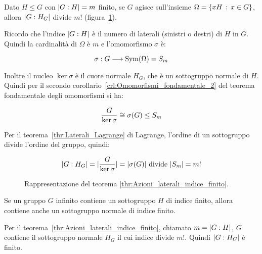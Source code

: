 \begin{teorema}
	\label{thr:Azioni_laterali_indice_finito}
	Dato $H \le G$ con $\lvert G:H \rvert= m$ finito, se $G$ agisce sull'insieme $\Omega = \{xH \,:\, x \in G\}$, allora $\lvert G:H_G \rvert$ divide $m!$ (figura~\ref{fig:Azioni_laterali_indice_finito}).
\end{teorema}
\begin{dimostrazione}
	Ricordo che l'indice $\lvert G:H \rvert$ è il numero di laterali (sinistri o destri) di $H$ in $G$. Quindi la cardinalità di $\Omega$ è $m$ e l'omomorfismo $\sigma$ è:
	
	\begin{equation}
		\sigma: G \longrightarrow \operatorname{Sym}(\Omega) = S_m
	\end{equation}

	Inoltre il nucleo $\ker \sigma$ è il cuore normale $H_G$, che è un sottogruppo normale di $H$. Quindi per il secondo corollario~\ref{crl:Omomorfismi_fondamentale_2} del teorema fondamentale degli omomorfismi si ha:
	
	\begin{equation}
		\dfrac{G}{\ker \sigma} \cong \sigma(G) \le S_m
	\end{equation}

	Per il teorema~\ref{thr:Laterali_Lagrange} di Lagrange, l'ordine di un sottogruppo divide l'ordine del gruppo, quindi:
	
	\begin{equation}
		\lvert G:H_G \rvert = \lvert \dfrac{G}{\ker \sigma} \rvert = \lvert \sigma(G) \rvert \text{ divide } \lvert S_m \rvert = m!
	\end{equation}
	
	
\end{dimostrazione}

\begin{figure}[tp]
	\centering
	\caption{Rappresentazione del teorema \ref{thr:Azioni_laterali_indice_finito}.}
	\label{fig:Azioni_laterali_indice_finito}
\end{figure}

\begin{teorema}
	Se un gruppo $G$ infinito contiene un sottogruppo $H$ di indice finito, allora contiene anche un sottogruppo normale di indice finito.
\end{teorema}
\begin{dimostrazione}
	Per il teorema~\ref{thr:Azioni_laterali_indice_finito}, chiamato $m = \lvert G:H \rvert$, $G$ contiene il sottogruppo normale $H_G$ il cui indice divide $m!$. Quindi $\lvert G:H_G \rvert$ è finito.
\end{dimostrazione}

